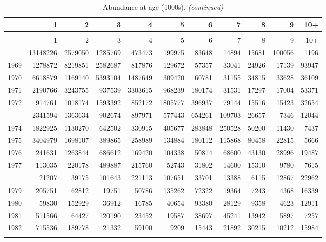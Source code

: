 \documentclass[
]{article}
\begin{document}
\begin{longtable}[t]{lrrrrrrrrrr}
\caption{\label{tab:NAA-table}Abundance at age (1000s).}\\
\toprule
  & 1 & 2 & 3 & 4 & 5 & 6 & 7 & 8 & 9 & 10+\\
\midrule
\endfirsthead
\caption[]{Abundance at age (1000s). \textit{(continued)}}\\
\toprule
  & 1 & 2 & 3 & 4 & 5 & 6 & 7 & 8 & 9 & 10+\\
\midrule
\endhead

\endfoot
\bottomrule
\endlastfoot
1968 & 13148226 & 2579050 & 1285769 & 473473 & 199975 & 83648 & 14894 & 15681 & 100056 & 1196\\
1969 & 1278872 & 8219851 & 2582687 & 817876 & 129672 & 57357 & 33041 & 24926 & 17139 & 93947\\
1970 & 6618879 & 1169140 & 5393104 & 1487649 & 309420 & 60781 & 31155 & 34815 & 33628 & 36109\\
1971 & 2190766 & 3243755 & 937539 & 3303615 & 968239 & 180174 & 31531 & 17297 & 17004 & 53371\\
1972 & 914761 & 1018174 & 1593392 & 852172 & 1805777 & 396937 & 79144 & 15516 & 15423 & 32654\\
\addlinespace
1973 & 2341594 & 1363634 & 902674 & 897971 & 577443 & 654261 & 109703 & 26657 & 7346 & 12044\\
1974 & 1822925 & 1130270 & 642502 & 330915 & 405677 & 283848 & 250528 & 50200 & 11430 & 7437\\
1975 & 3404979 & 1698107 & 389865 & 258989 & 134884 & 180112 & 115868 & 80458 & 22815 & 5666\\
1976 & 241631 & 1263844 & 686612 & 169420 & 104338 & 50814 & 68600 & 43130 & 28996 & 19487\\
1977 & 113035 & 220178 & 489887 & 215760 & 52743 & 31802 & 14600 & 15310 & 9780 & 7615\\
\addlinespace
1978 & 21207 & 39175 & 101643 & 221113 & 107651 & 33701 & 13388 & 6115 & 12867 & 22962\\
1979 & 205751 & 62812 & 19751 & 50786 & 135262 & 72322 & 19364 & 7243 & 4368 & 16339\\
1980 & 59830 & 152929 & 36912 & 16785 & 40654 & 93380 & 28129 & 9358 & 4623 & 12911\\
1981 & 511566 & 64427 & 120190 & 23452 & 19587 & 38697 & 45241 & 13942 & 5897 & 7257\\
1982 & 715536 & 189778 & 21332 & 59100 & 9209 & 15443 & 21892 & 30215 & 10212 & 15984\\
\addlinespace

\end{longtable}
\end{document}
